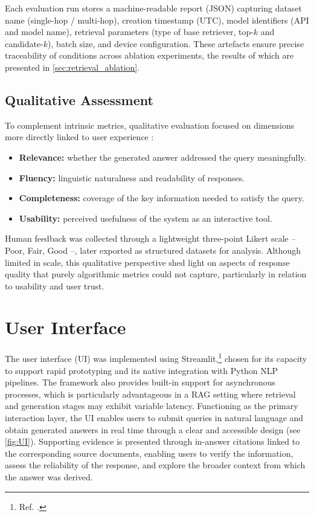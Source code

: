 \begin{spacing}{1.5}
Each evaluation run stores a machine-readable report (JSON) capturing dataset name (single-hop / multi-hop), creation timestamp (UTC), model identifiers (API and model name), retrieval parameters (type of base retriever, top-$k$ and candidate-$k$), batch size, and device configuration. These artefacts ensure precise traceability of conditions across ablation experiments, the results of which are presented in \autoref{sec:retrieval_ablation}.

\subsection{Qualitative Assessment}
To complement intrinsic metrics, qualitative evaluation focused on dimensions more directly linked to user experience \citep{bronsdon_understanding_2025}:
\begin{itemize}
      \item \textbf{Relevance:} whether the generated answer addressed the query meaningfully.
      \item \textbf{Fluency:} linguistic naturalness and readability of responses.
      \item \textbf{Completeness:} coverage of the key information needed to satisfy the query.
      \item \textbf{Usability:} perceived usefulness of the system as an interactive tool.
\end{itemize}

Human feedback was collected through a lightweight three-point Likert scale -- Poor, Fair, Good --, later exported as structured datasets for analysis. Although limited in scale, this qualitative perspective shed light on aspects of response quality that purely algorithmic metrics could not capture, particularly in relation to usability and user trust.


\section{User Interface}
The user interface (UI) was implemented using Streamlit,\footnote{Ref. \citep{noauthor_streamlit_2025}.} chosen for its capacity to support rapid prototyping and its native integration with Python NLP pipelines. The framework also provides built-in support for asynchronous processes, which is particularly advantageous in a RAG setting where retrieval and generation stages may exhibit variable latency. Functioning as the primary interaction layer, the UI enables users to submit queries in natural language and obtain generated answers in real time through a clear and accessible design (see \autoref{fig:UI}). Supporting evidence is presented through in-answer citations linked to the corresponding source documents, enabling users to verify the information, assess the reliability of the response, and explore the broader context from which the answer was derived.


\end{spacing}
